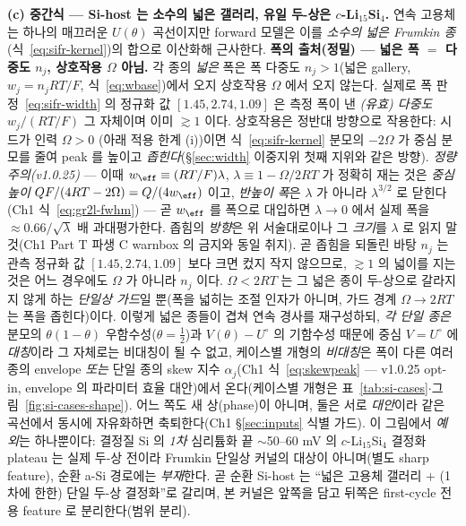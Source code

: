 \textbf{(c) 중간식 --- Si-host 는 소수의 넓은 갤러리, 유일 두-상은 $c$-Li$_{15}$Si$_4$.} 연속 고용체는 하나의
매끄러운 $U(\theta)$ 곡선이지만 forward 모델은 이를 \emph{소수의 넓은 Frumkin 종}(식~\eqref{eq:sifr-kernel})의
합으로 이산화해 근사한다. \textbf{폭의 출처(정밀) --- 넓은 폭 $=$ 다중도 $n_j$, 상호작용 $\Omega$ 아님.} 각 종의
\emph{넓은} 폭은 폭 다중도 $n_j{>}1$(넓은 gallery, $w_j{=}n_jRT/F$, 식~\eqref{eq:wbase})에서 오지 상호작용 $\Omega$
에서 오지 않는다. 실제로 폭 판정~\eqref{eq:sifr-width} 의 정규화 값 $[1.45,2.74,1.09]$ 은 측정 폭이 낸 \emph{(유효)
다중도} $w_j/(RT/F)$ 그 자체이며 이미 $\gtrsim1$ 이다. 상호작용은 정반대 방향으로 작용한다: 시드가 인력 $\Omega{>}0$
(아래 적용 한계 (i))이면 식~\eqref{eq:sifr-kernel} 분모의 $-2\Omega$ 가 중심 분모를 줄여 peak 를 높이고
\emph{좁힌다}(\S\ref{sec:width} 이중지위 첫째 지위와 같은 방향). \emph{정량 주의(v1.0.25)} --- 이때
$w_\eff\equiv(RT/F)\lambda$, $\lambda\equiv1-\Omega/2RT$ 가 정확히 재는 것은 \emph{중심 높이}
$QF/(4RT-2\Omega)=Q/(4w_\eff)$ 이고, \emph{반높이 폭}은 $\lambda$ 가 아니라 $\lambda^{3/2}$ 로 닫힌다
(Ch1 식~\eqref{eq:gr2l-fwhm}) --- 곧 $w_\eff$ 를 폭으로 대입하면 $\lambda\to0$ 에서 실제 폭을
$\approx0.66/\sqrt\lambda$ 배 과대평가한다. 좁힘의 \emph{방향}은 위 서술대로이나 그 \emph{크기}를 $\lambda$ 로
읽지 말 것(Ch1 Part T 파생 C warnbox 의 금지와 동일 취지). 곧 좁힘을 되돌린 바탕 $n_j$ 는 관측 정규화 값 $[1.45,2.74,1.09]$ 보다
크면 컸지 작지 않으므로, $\gtrsim1$ 의 넓이를 지는 것은 어느 경우에도 $\Omega$ 가 아니라 $n_j$ 이다. $\Omega<2RT$ 는
그 넓은 종이 두-상으로 갈라지지 않게 하는 \emph{단일상 가드}일 뿐(폭을 넓히는 조절 인자가 아니며, 가드 경계
$\Omega{\to}2RT$ 는 폭을 좁힌다)이다. 이렇게 넓은 종들이 겹쳐 연속 경사를 재구성하되, \emph{각 단일 종은} 분모의
$\theta(1-\theta)$ 우함수성($\theta{=}\tfrac12$)과 $V(\theta){-}U^\circ$ 의 기함수성 때문에 중심 $V{=}U^\circ$ 에
\emph{대칭}이라 그 자체로는 비대칭이 될 수 없고, 케이스별 개형의 \emph{비대칭}은 폭이 다른 여러 종의 envelope
\emph{또는} 단일 종의 skew 지수 $\alpha_j$(Ch1 식~\eqref{eq:skewpeak} --- v1.0.25 opt-in, envelope 의 파라미터
효율 대안)에서 온다(케이스별 개형은 표~\ref{tab:si-cases}$\cdot$그림~\ref{fig:si-cases-shape}). 어느 쪽도 새
상(phase)이 아니며, 둘은 서로 \emph{대안}이라 같은 곡선에서 동시에 자유화하면 축퇴한다(Ch1
\S\ref{sec:inputs} 식별 가드). 이 그림에서 \emph{예외}는
하나뿐이다: 결정질 Si 의 \emph{1차} 심리튬화 끝 $\sim$50--60 mV 의 $c$-Li$_{15}$Si$_4$ 결정화 plateau 는 실제 두-상
전이라\cite{obrovac_christensen2004,ogata_nmr2014} Frumkin 단일상 커널의 대상이 아니며(별도 sharp feature), 순환
a-Si 경로에는 \emph{부재}한다\cite{chevrier_dahn2009}. 곧 순환 Si-host 는 ``넓은 고용체 갤러리 $+$ (1차에 한한)
단일 두-상 결정화''로 갈리며, 본 커널은 앞쪽을 담고 뒤쪽은 first-cycle 전용 feature 로 분리한다(범위 분리).

